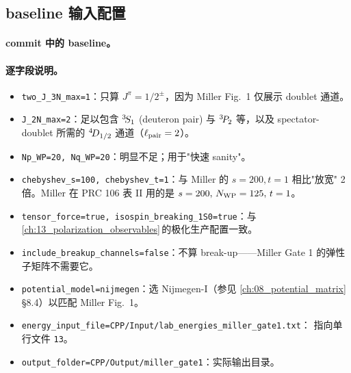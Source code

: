 \subsection{baseline 输入配置}
\label{subsec:ch14-input-config}

\paragraph{commit 中的 baseline。}


\paragraph{逐字段说明。}
\begin{itemize}
  \item \texttt{two\_J\_3N\_max=1}：只算 \(J^\pi = 1/2^\pm\)，因为 Miller
        Fig.~1 仅展示 doublet 通道。
  \item \texttt{J\_2N\_max=2}：足以包含 \({}^{3}\!S_{1}\) (deuteron pair) 与
        \({}^{3}\!P_{2}\) 等，以及 spectator-doublet 所需的 \({}^{4}\!D_{1/2}\)
        通道（\(\ell_{\rm pair} = 2\)）。
  \item \texttt{Np\_WP=20, Nq\_WP=20}：明显不足；用于"快速 sanity"。
  \item \texttt{chebyshev\_s=100, chebyshev\_t=1}：与 Miller 的 \(s = 200,
        t = 1\) 相比"放宽" 2 倍。Miller 在 PRC 106 表 II 用的是
        \(s = 200,\,N_{\rm WP} = 125,\,t = 1\)。
  \item \texttt{tensor\_force=true, isospin\_breaking\_1S0=true}：与
        \cref{ch:13_polarization_observables}\(\,\)的极化生产配置一致。
  \item \texttt{include\_breakup\_channels=false}：不算 break-up——Miller Gate 1
        的弹性子矩阵不需要它。
  \item \texttt{potential\_model=nijmegen}：选 Nijmegen-I（参见
        \cref{ch:08_potential_matrix}\(\,\)\S 8.4）以匹配 Miller Fig.~1。
  \item \texttt{energy\_input\_file=CPP/Input/lab\_energies\_miller\_gate1.txt}：
        指向单行文件 \texttt{13}。
  \item \texttt{output\_folder=CPP/Output/miller\_gate1}：实际输出目录。
\end{itemize}

